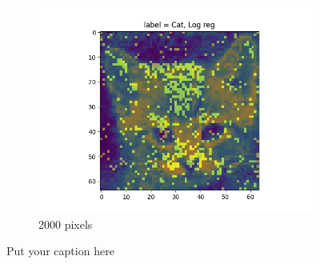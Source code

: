 \documentclass{article}
\begin{document}
\begin{figure}[H]
\begin{subfigure}{.33\textwidth}
  \includegraphics[width=1\linewidth]{2d/,2000, Log reg.png}  
  \caption{2000 pixels}
  \label{fig:sub-second}
\end{subfigure}
\caption{Put your caption here}
\label{feet select 2d}
\end{figure}
\end{document}
